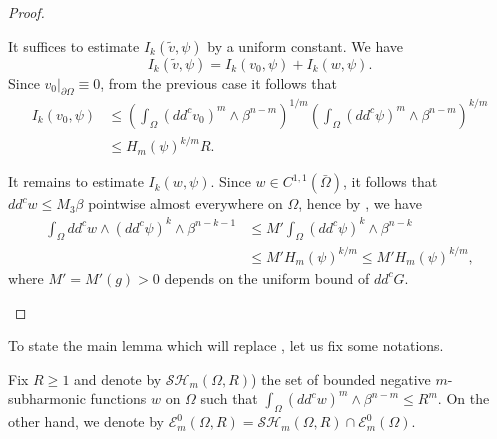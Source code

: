 \documentclass[JEP,XML,SOM,Unicode]{cedram}
\theoremstyle{definition}
\begin{document}
\begin{proof}
\begin{enumerate}
It suffices to estimate $ I_k (\tilde v,\psi) $ by a uniform constant. We have
\[
I_k (\tilde v,\psi) = I_k (v_0, \psi) + I_k (w,\psi).
\]
Since $v_0|_{\partial \Omega} \equiv 0$, from the previous case it follows that
\begin{align*}
I_k (v_0,\psi) & \leq  \left(\int_\Omega (dd^c v_0)^m \wedge \beta^{n-m}\right)^{1 \slash m} \left(\int_\Omega (dd^c \psi)^m \wedge \beta^{n-m}\right)^{k \slash m} \\
&\leq  H_m (\psi)^{k\slash m} R.
\end{align*}

It remains to estimate $ I_k (w,\psi)$.
Since $w \in C^{1,1} (\bar{\Omega})$, it follows that $dd^c w \leq M_3 \beta$ pointwise almost everywhere on $\Omega$, hence by \cite[Lem.\,2.8]{BZ20} , we have
\begin{align*}
\int_\Omega dd^c w \wedge (dd^c \psi)^k \wedge \beta^{n-k-1} &\leq  M' \int_\Omega (dd^c \psi) ^k \wedge \beta^{n-k} \\
& \leq  M' H_m (\psi)^{k\slash m} \leq M' H_m (\psi)^{k\slash m},
\end{align*}
where $M' = M'(g) > 0$ depends on the uniform bound of $dd^c G$.\qedhere
\end{enumerate}
\end{proof}

To state the main lemma which will replace \cite[Lem.\,4.2]{BZ20}, let us fix some notations.

Fix $R \geq 1$ and denote by $\mathcal{SH}_m (\Omega,R)$) the set of bounded negative $m$-subharmonic functions $w$ on $\Omega$ such that $\int_\Omega (dd^c w)^m \wedge \beta^{n-m} \leq R^m$.
On the other hand, we denote by $ \mathcal{E}_m^0 (\Omega,R) = \mathcal{SH}_m (\Omega,R) \cap \mathcal{E}^0_m (\Omega)$.
\end{document}
